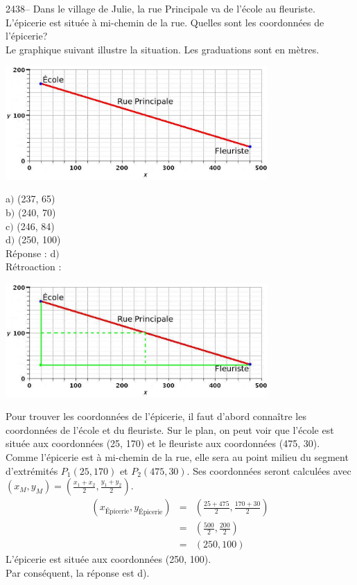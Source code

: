 \documentclass[letterpaper, 12pt]{article}
\begin{document}
2438-- Dans le village de Julie, la rue Principale va de l'\'ecole au fleuriste. L'\'epicerie est situ\'ee \`a mi-chemin de la rue. Quelles sont les coordonn\'ees de l'\'epicerie? \\
Le graphique suivant illustre la situation. Les graduations sont en m\`etres. \\
\begin{center}
 \includegraphics[width=10cm,bb=14 14 815 362]{Q2438.eps}
\end{center}
a$)$ (237, 65)\\
b$)$ (240, 70)\\
c$)$ (246, 84)\\
d$)$ (250, 100)\\

R\'eponse : d$)$\\

R\'etroaction :\\
\begin{center}
 \includegraphics[width=10cm,bb=14 14 815 362]{Q2438r.eps}
\end{center}
Pour trouver les coordonn\'ees de l'\'epicerie, il faut d'abord conna\^itre les coordonn\'ees de l'\'ecole et du fleuriste. Sur le plan, on peut voir que l'\'ecole est situ\'ee aux coordonn\'ees (25, 170) et le fleuriste aux coordonn\'ees (475, 30). Comme l'\'epicerie est \`a mi-chemin de la rue, elle sera au point milieu du segment d'extr\'emit\'es $P_{1}(25, 170)$ et $P_{2}(475, 30)$. Ses coordonn\'ees seront calcul\'ees avec \mbox{$(x_{M}, y_{M})=\left( \frac{x_{1}+x_{2}}{2}, \frac{y_{1}+y_{2}}{2}\right) $}.
\begin{eqnarray*}
(x_{\textrm{\'Epicerie}}, y_{\textrm{\'Epicerie}})&=&\left( \frac{25+475}{2}, \frac{170+30}{2}\right)\\[2mm]
&=&\left( \frac{500}{2}, \frac{200}{2}\right)\\[2mm]
&=&\left( 250, 100\right)
\end{eqnarray*}
L'\'epicerie est situ\'ee aux coordonn\'ees (250, 100).\\
Par cons\'equent, la r\'eponse est d).\\
\end{document}
